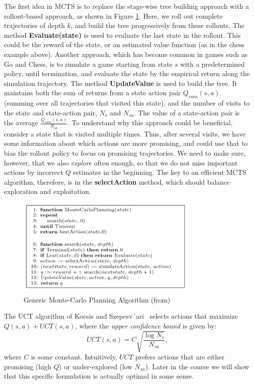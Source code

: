 The first idea in MCTS is to replace the stage-wise tree building approach with a rollout-based approach, as shown in Figure \ref{fig:mcts}. Here, we roll out complete trajectories of depth $k$, and build the tree progressively from these rollouts. The method \textbf{Evaluate(state)} is used to evaluate the last state in the rollout. This could be the reward of the state, or an estimated value function (as in the chess example above). Another approach, which has become common in games such as Go and Chess, is to simulate a game starting from state $s$ with a predetermined policy, until termination, and evaluate the state by the empirical return along the simulation trajectory.
The method \textbf{UpdateValue} is used to build the tree. It maintains both the sum of returns from a state action pair $Q_{sum}(s,a)$ (summing over all trajectories that visited this state), and the number of visits to the state and state-action pair, $N_s$ and $N_{sa}$. The value of a state-action pair is the average $\frac{Q_{sum}(s,a)}{N_{sa}}$. To understand why this approach could be beneficial, consider a state that is visited multiple times. Thus, after several visits, we have some information about which actions are more promising, and could use that to bias the rollout policy to focus on promising trajectories. We need to make sure, however, that we also \emph{explore} often enough, so that we do not miss important actions by incorrect $Q$ estimates in the beginning.
The key to an efficient MCTS algorithm, therefore, is in the \textbf{selectAction} method, which should balance exploration and exploitation.

\begin{figure}[h]
    \centering
    \includegraphics[width=0.8\textwidth]{FIGS/uct.png}
    \caption{Generic Monte-Carlo Planning Algorithm (from\cite{kocsis2006bandit})}
    \label{fig:mcts}
\end{figure}

The UCT algorithm of Kocsis and Szepesv´ari~\cite{kocsis2006bandit} selects actions that maximize $Q(s,a) + UCT(s,a)$, where the \emph{upper confidence bound} is given by: 
$$
UCT(s,a) = C \sqrt{\frac{\log N_s}{N_{sa}}},
$$
where $C$ is some constant. Intuitively, $UCT$ prefers actions that are either promising (high $Q$) or under-explored (low $N_{sa}$). Later in the course we will show that this specific formulation is actually optimal in some sense.

